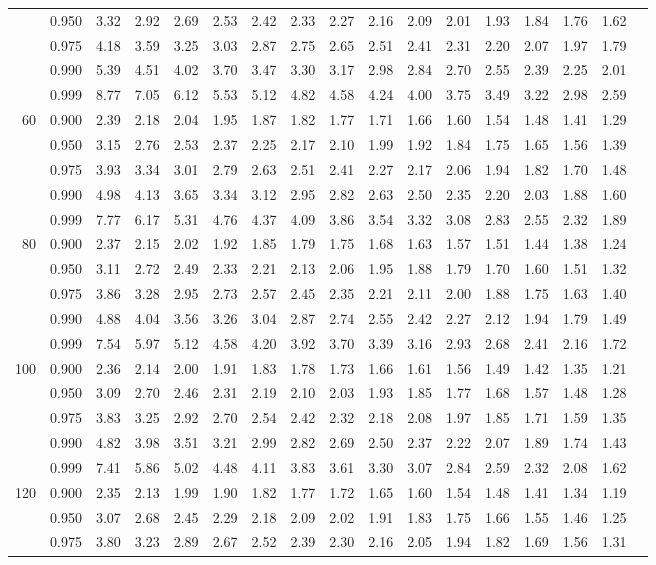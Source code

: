 {\begin{center}
\begin{tabular}{rrr@{\,}r@{\,}r@{\,}r@{\,}r@{\,}r@{\,}r@{\,}r
                   @{\,}r@{\,}r@{\,}r@{\,}r@{\,}r@{\,}r@{\,}r}
  &0.950&3.32&2.92&2.69&2.53&2.42&2.33&2.27&2.16&2.09&2.01&1.93&1.84&1.76&1.62\\
  &0.975&4.18&3.59&3.25&3.03&2.87&2.75&2.65&2.51&2.41&2.31&2.20&2.07&1.97&1.79\\
  &0.990&5.39&4.51&4.02&3.70&3.47&3.30&3.17&2.98&2.84&2.70&2.55&2.39&2.25&2.01\\
  &0.999&8.77&7.05&6.12&5.53&5.12&4.82&4.58&4.24&4.00&3.75&3.49&3.22&2.98&2.59\\
60&0.900&2.39&2.18&2.04&1.95&1.87&1.82&1.77&1.71&1.66&1.60&1.54&1.48&1.41&1.29\\
  &0.950&3.15&2.76&2.53&2.37&2.25&2.17&2.10&1.99&1.92&1.84&1.75&1.65&1.56&1.39\\
  &0.975&3.93&3.34&3.01&2.79&2.63&2.51&2.41&2.27&2.17&2.06&1.94&1.82&1.70&1.48\\
  &0.990&4.98&4.13&3.65&3.34&3.12&2.95&2.82&2.63&2.50&2.35&2.20&2.03&1.88&1.60\\
  &0.999&7.77&6.17&5.31&4.76&4.37&4.09&3.86&3.54&3.32&3.08&2.83&2.55&2.32&1.89\\
80&0.900&2.37&2.15&2.02&1.92&1.85&1.79&1.75&1.68&1.63&1.57&1.51&1.44&1.38&1.24\\
  &0.950&3.11&2.72&2.49&2.33&2.21&2.13&2.06&1.95&1.88&1.79&1.70&1.60&1.51&1.32\\
  &0.975&3.86&3.28&2.95&2.73&2.57&2.45&2.35&2.21&2.11&2.00&1.88&1.75&1.63&1.40\\
  &0.990&4.88&4.04&3.56&3.26&3.04&2.87&2.74&2.55&2.42&2.27&2.12&1.94&1.79&1.49\\
  &0.999&7.54&5.97&5.12&4.58&4.20&3.92&3.70&3.39&3.16&2.93&2.68&2.41&2.16&1.72\\
100
  &0.900&2.36&2.14&2.00&1.91&1.83&1.78&1.73&1.66&1.61&1.56&1.49&1.42&1.35&1.21\\
  &0.950&3.09&2.70&2.46&2.31&2.19&2.10&2.03&1.93&1.85&1.77&1.68&1.57&1.48&1.28\\
  &0.975&3.83&3.25&2.92&2.70&2.54&2.42&2.32&2.18&2.08&1.97&1.85&1.71&1.59&1.35\\
  &0.990&4.82&3.98&3.51&3.21&2.99&2.82&2.69&2.50&2.37&2.22&2.07&1.89&1.74&1.43\\
  &0.999&7.41&5.86&5.02&4.48&4.11&3.83&3.61&3.30&3.07&2.84&2.59&2.32&2.08&1.62\\
120
  &0.900&2.35&2.13&1.99&1.90&1.82&1.77&1.72&1.65&1.60&1.54&1.48&1.41&1.34&1.19\\
  &0.950&3.07&2.68&2.45&2.29&2.18&2.09&2.02&1.91&1.83&1.75&1.66&1.55&1.46&1.25\\
  &0.975&3.80&3.23&2.89&2.67&2.52&2.39&2.30&2.16&2.05&1.94&1.82&1.69&1.56&1.31\\

\end{tabular}
\end{center}}
